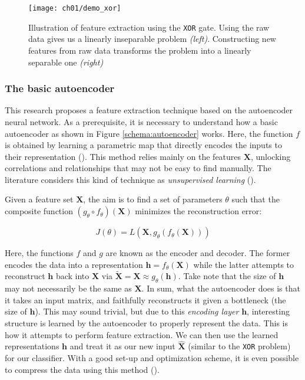 \begin{figure}[!b]
  \centering
  \texttt{[image: ch01/demo\_xor]}
  \caption[Illustration of feature extraction using the \texttt{XOR} gate]{
      Illustration of feature extraction using the \texttt{XOR} gate. Using the
      raw data gives us a linearly inseparable problem \textit{(left)}.
      Constructing new features from raw data transforms the problem into a
      linearly separable one \textit{(right)}
  }
  \label{demo:xor}
\end{figure}

\subsubsection{The basic autoencoder}


\par This research proposes a feature extraction technique based on the
autoencoder neural network. As a prerequisite, it is necessary to understand
how a basic autoencoder as shown in Figure \ref{schema:autoencoder} works.
Here, the function $f$ is obtained by learning a
parametric map that directly encodes the inputs to their representation
(\cite{hinton1994autoencoders}). This method relies mainly on the features
$\mathbf{X}$, unlocking correlations and relationships that may not be easy to
find manually. The literature considers this kind of technique as \textit{unsupervised
learning} (\cite{bengio2013representation}).

\par Given a feature set $\mathbf{X}$, the aim is to find a set of parameters
$\theta$ such that the composite function $(g_{\theta} \circ
f_{\theta})(\mathbf{X})$ minimizes the reconstruction error:

\[
    J(\theta) = L(\mathbf{X}, g_{\theta}(f_{\theta}(\mathbf{X})))
\]

\noindent Here, the functions $f$ and $g$ are known as the encoder and decoder. The
former encodes the data into a representation $\mathbf{h} = f_{\theta}(\mathbf{X})$
while the latter attempts to reconstruct $\mathbf{h}$ back into $\mathbf{X}$ via
$\mathbf{\widetilde{X}} = \mathbf{X} \approx g_{\theta}(\mathbf{h})$. 
Take note that the size of $\mathbf{h}$ may not necessarily be the same as $\mathbf{X}$.
In sum, what the autoencoder does is that it takes an input matrix, and faithfully 
reconstructs it given a bottleneck (the size of $\mathbf{h}$). This may sound trivial,
but due to this \textit{encoding layer} $\mathbf{h}$, interesting structure is learned by the
autoencoder to properly represent the data. This is how it attempts to perform
feature extraction. We can then use the learned representations $\mathbf{h}$
and treat it as our new input $\mathbf{\widehat{X}}$ (similar to the
\texttt{XOR} problem) for our classifier. With a good set-up and optimization scheme,
it is even possible to compress the data using this method (\cite{theis2017lossy}).


